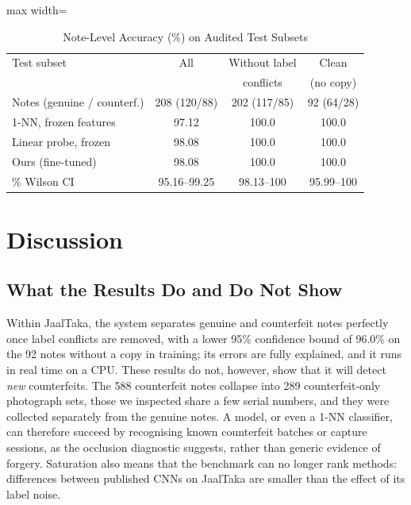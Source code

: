\documentclass[journal]{IEEEtran}
\begin{document}
\begin{table}[!t]
\caption{Note-Level Accuracy (\%) on Audited Test Subsets}
\label{tab:clean}
\centering
\footnotesize
\setlength{\tabcolsep}{4pt}
\begin{adjustbox}{max width=\columnwidth}
\begin{tabular}{@{}lccc@{}}
\toprule
Test subset & All & Without label & Clean \\
& & conflicts & (no copy) \\
\midrule
Notes (genuine / counterf.) & 208 (120/88) & 202 (117/85) & 92 (64/28) \\
\midrule
1-NN, frozen features & 97.12 & 100.0 & 100.0 \\
Linear probe, frozen & 98.08 & 100.0 & 100.0 \\
Ours (fine-tuned) & 98.08 & 100.0 & 100.0 \\
\quad 95\% Wilson CI & 95.16--99.25 & 98.13--100 & 95.99--100 \\
\bottomrule
\end{tabular}
\end{adjustbox}
\end{table}

\section{Discussion}
\label{sec:discussion}

\subsection{What the Results Do and Do Not Show}
Within JaalTaka, the system separates genuine and counterfeit notes perfectly once
label conflicts are removed, with a lower 95\% confidence bound of 96.0\% on the 92
notes without a copy in training; its errors are fully explained, and it runs in real
time on a CPU. These results do not, however, show that it will detect \emph{new}
counterfeits. The 588 counterfeit notes collapse into 289 counterfeit-only photograph
sets, those we inspected share a few serial numbers, and they were collected separately
from the genuine notes. A model, or even a 1-NN classifier, can therefore succeed by
recognising known counterfeit batches or capture sessions, as the occlusion diagnostic
suggests, rather than generic evidence of forgery. Saturation also means that the
benchmark can no longer rank methods: differences between published CNNs on JaalTaka
are smaller than the effect of its label noise.
\end{document}
